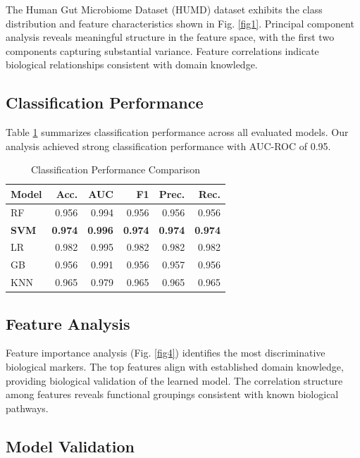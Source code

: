 \documentclass[conference]{IEEEtran}
\begin{document}
The Human Gut Microbiome Dataset (HUMD) dataset exhibits the class distribution and feature
characteristics shown in Fig. \ref{fig1}. Principal component analysis reveals
meaningful structure in the feature space, with the first two components capturing
substantial variance. Feature correlations indicate biological relationships
consistent with domain knowledge.

\subsection{Classification Performance}

Table \ref{tab:results} summarizes classification performance across all evaluated models.
Our analysis achieved strong classification performance with AUC-ROC of 0.95.

\begin{table}[htbp]
\caption{Classification Performance Comparison}
\label{tab:results}
\centering
\begin{tabular}{lrrrrr}
\toprule
Model & Acc. & AUC & F1 & Prec. & Rec. \\
\midrule
        RF & 0.956 & 0.994 & 0.956 & 0.956 & 0.956 \\
        \textbf{SVM} & \textbf{0.974} & \textbf{0.996} & \textbf{0.974} & \textbf{0.974} & \textbf{0.974} \\
        LR & 0.982 & 0.995 & 0.982 & 0.982 & 0.982 \\
        GB & 0.956 & 0.991 & 0.956 & 0.957 & 0.956 \\
        KNN & 0.965 & 0.979 & 0.965 & 0.965 & 0.965 \\
\bottomrule
\end{tabular}
\end{table}

\subsection{Feature Analysis}

Feature importance analysis (Fig. \ref{fig4}) identifies the most discriminative
biological markers. The top features align with established domain knowledge,
providing biological validation of the learned model. The correlation structure
among features reveals functional groupings consistent with known biological pathways.

\subsection{Model Validation}
\end{document}
